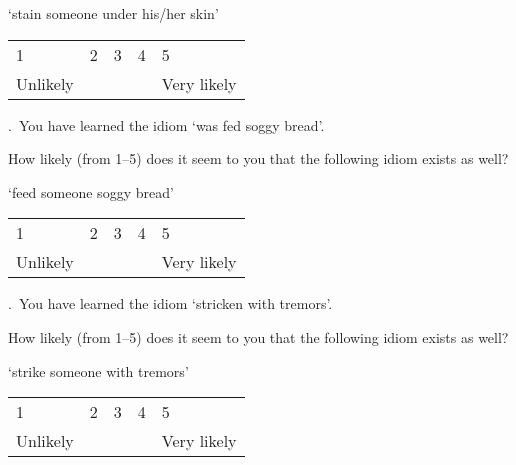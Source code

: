 \documentclass[output=paper]{langsci/langscibook}
\begin{document}
\begin{paperappendix}
\noindent \enquote*{{stain someone under his/her skin}}\vspace{.5\baselineskip}

\noindent \begin{tabularx}{\textwidth}{XXXXX}
        1 & 2 & 3 & 4 & 5\\
        Unlikely & & & & Very likely\\
        \end{tabularx}\vspace{1\baselineskip}


.\ You have learned the idiom \enquote*{{was fed soggy bread}}.

\noindent How likely (from 1--5) does it seem to you that the following idiom exists
    as well?\vspace{.5\baselineskip}

\noindent \enquote*{{feed someone soggy bread}}\vspace{.5\baselineskip}

\noindent \begin{tabularx}{\textwidth}{XXXXX}
        1 & 2 & 3 & 4 & 5\\
        Unlikely & & & & Very likely\\
        \end{tabularx}\vspace{1\baselineskip}


.\ You have learned the idiom \enquote*{{stricken with tremors}}.

\noindent How likely (from 1--5) does it seem to you that the following idiom exists
    as well?\vspace{.5\baselineskip}

\noindent \enquote*{{strike someone with tremors}}\vspace{.5\baselineskip}

\noindent \begin{tabularx}{\textwidth}{XXXXX}
        1 & 2 & 3 & 4 & 5\\
        Unlikely & & & & Very likely\\
        \end{tabularx}



\end{paperappendix}
\end{document}
